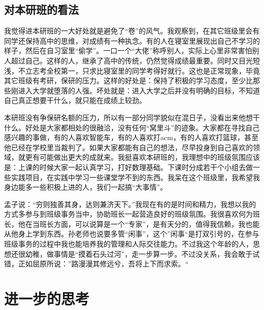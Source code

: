 \documentclass{article}
\begin{document}
\subsection{对本研班的看法}
我觉得进本研班的一大好处就是避免了“卷”的风气。我观察到，在其它班级里会有同学还保持高中的思维，对成绩有一种执念。有的人在寝室里展现出自己不学习的样子，然后在自习室里“偷学”。一口一个“大佬”称呼别人，实际上心里非常害怕别人超过自己。这样的人，继承了高中的传统，仍然觉得成绩最重要。同时又目光短浅，不立志考全校第一，只求比寝室里的同学考得好就行。这也是正常现象，毕竟其它班级有考研，保研的压力。这样的好处是：保持了积极的学习态度，至少比那些刚进入大学就堕落的人强。坏处就是：进入大学之后并没有明确的目标，不知道自己真正想要干什么，就只能在成绩上较劲。\par 
本研班没有争保研名额的压力，所以有一部分同学貌似在混日子，没看出来他想干什么。好处是大家都相处的很融洽，没有任何“窝里斗”的迹象。大家都在寻找自己感兴趣的事做，有的人喜欢智能车，有的人喜欢打acm，有的人喜欢打篮球，甚至他已经在学校里当裁判了。如果大家都能有自己的想法，尽早投身到自己喜欢的领域，就更有可能做出更大的成就来。我挺喜欢本研班的，我理想中的班级氛围应该是：上课的时候大家一起认真学习，打好数理基础。下课时分成若干个小组去做一些实践项目，在实践中学习一些课堂学不到的东西。我呆在这个班级里，我希望我身边能多一些积极上进的人，我们一起搞“大事情”。\par 
孟子说：“穷则独善其身，达则兼济天下。”我现在有的是时间和精力，我想以我的方式多参与到班级事务当中，协助班长一起营造良好的班级氛围。我很喜欢何为班长，他在当班长方面，可以说算是一个“专家”，是有天分的，值得我信赖，我也能从他身上学到东西。孙老师也说要多管“闲事”，这个”闲事“是打双引号的，在参与班级事务的过程中我也能培养我的管理和人际交往能力。不过我这个年龄的人，思想还很幼稚，做事情是“摸着石头过河”，走一步算一步。不过没关系，我会敢于试错，正如屈原所说：”路漫漫其修远兮，吾将上下而求索。“\par 

\section{进一步的思考}
\end{document}
